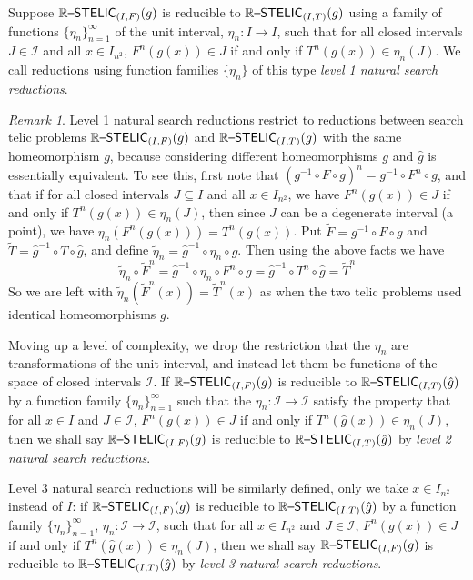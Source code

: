 \documentclass{amsart}
\theoremstyle{theorem}
\theoremstyle{remark}
\newtheorem{remark}[theorem]{Remark}
\newcommand{\ccRSTELIC}{\mathbb{R}\textsf{\upshape --STELIC}}
\newcommand{\cI}{\mathcal{I}}
\begin{document}
Suppose $\ccRSTELIC_{(I, F)}(g)$ is reducible to $\ccRSTELIC_{(I, T)}(g)$ using a family of functions $\{\eta_n\}_{n=1}^\infty$ of the unit interval, $\eta_n:I\rightarrow I$, such that for all closed intervals $J \in \cI$ and all $x \in I_{n^2}$, $F^n(g(x)) \in J$ if and only if $T^n(g(x)) \in \eta_n(J)$. We call reductions using function families $\{\eta_n\}$ of this type \emph{level 1 natural search reductions}.

\begin{remark}
Level 1 natural search reductions restrict to reductions between search telic problems $\ccRSTELIC_{(I, F)}(g)$ and $\ccRSTELIC_{(I, T)}(g)$ with the same homeomorphism $g$, because considering different homeomorphisms $g$ and $\hat{g}$ is essentially equivalent. To see this, first note that $(g^{-1} \circ F \circ g)^n = g^{-1}\circ F^n \circ g$, and that if for all closed intervals $J \subseteq I$ and all $x \in I_{n^2}$, we have $F^n(g(x)) \in J$ if and only if $T^n(g(x)) \in \eta_n(J)$, then since $J$ can be a degenerate interval (a point), we have $\eta_n(F^n(g(x))) = T^n(g(x))$.
Put $\tilde{F} = g^{-1}\circ F \circ g$ and $\tilde{T} = \hat{g}^{-1} \circ T \circ \hat{g}$, and define $\tilde{\eta}_n = \hat{g}^{-1} \circ \eta_n \circ g$. Then using the above facts we have
\[
\tilde{\eta}_n\circ \tilde{F}^n = \hat{g}^{-1} \circ \eta_n\circ F^n\circ g = \hat{g}^{-1} \circ T^n\circ \hat{g} = \tilde{T}^n
\]
So we are left with $\tilde{\eta}_n(\tilde{F}^n(x)) = \tilde{T}^n(x)$ as when the two telic problems used identical homeomorphisms $g$.
\end{remark}

Moving up a level of complexity, we drop the restriction that the $\eta_n$ are transformations of the unit interval, and instead let them be functions of the space of closed intervals $\cI$. If $\ccRSTELIC_{(I, F)}(g)$ is reducible to $\ccRSTELIC_{(I, T)}(\hat{g})$ by a function family $\{\eta_n\}_{n=1}^\infty$ such that the $\eta_n:\cI \rightarrow \cI$ satisfy the property that for all $x \in I$ and $J \in \cI$, $F^n(g(x)) \in J$ if and only if $T^n(\hat{g}(x)) \in \eta_n(J)$, then we shall say $\ccRSTELIC_{(I, F)}(g)$ is reducible to $\ccRSTELIC_{(I, T)}(\hat{g})$ by \emph{level 2 natural search reductions}.

Level 3 natural search reductions will be similarly defined, only we take $x \in I_{n^2}$ instead of $I$: if $\ccRSTELIC_{(I, F)}(g)$ is reducible to $\ccRSTELIC_{(I, T)}(\hat{g})$ by a function family $\{\eta_n\}_{n=1}^\infty$, $\eta_n:\cI \rightarrow \cI$, such that for all $x \in I_{n^2}$ and $J \in \cI$, $F^n(g(x)) \in J$ if and only if $T^n(\hat{g}(x)) \in \eta_n(J)$, then we shall say $\ccRSTELIC_{(I, F)}(g)$ is reducible to $\ccRSTELIC_{(I, T)}(\hat{g})$ by \emph{level 3 natural search reductions}.
\end{document}

